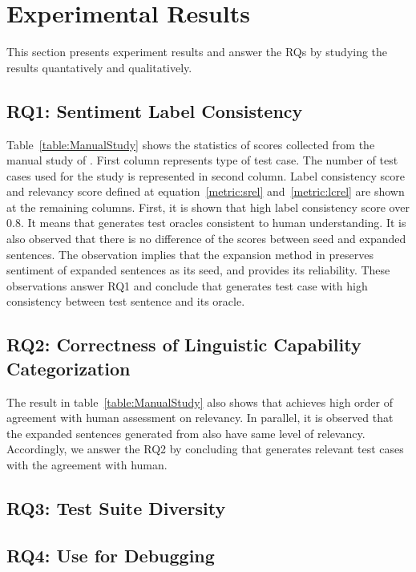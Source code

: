 \section{Experimental Results}
\label{sec:result}

This section presents experiment results and answer the RQs by
studying the results quantatively and qualitatively.


\subsection{RQ1: \tool Sentiment Label Consistency}
Table~\ref{table:ManualStudy} shows the statistics of scores collected
from the manual study of \tool. First column represents type of test
case. The number of test cases used for the study is represented in
second column. Label consistency score and \lc relevancy score defined
at equation~\ref{metric:srel} and~\ref{metric:lcrel} are shown at the
remaining columns. First, it is shown that high label consistency
score over 0.8. It means that \tool generates test oracles consistent
to human understanding. It is also observed that there is no
difference of the scores between seed and expanded sentences. The
observation implies that the expansion method in \tool preserves
sentiment of expanded sentences as its seed, and provides its
reliability. These observations answer RQ1 and conclude that \tool
generates test case with high consistency between test sentence and
its oracle.

\subsection{RQ2: Correctness of Linguistic Capability Categorization}
The result in table~\ref{table:ManualStudy} also shows that \tool
achieves high order of agreement with human assessment on \lc
relevancy. In parallel, it is observed that the expanded sentences
generated from \tool also have same level of \lc
relevancy. Accordingly, we answer the RQ2 by concluding that
\tool generates \lc relevant test cases with the agreement with human.


\subsection{RQ3: Test Suite Diversity}


\subsection{RQ4: Use \tool for Debugging}

